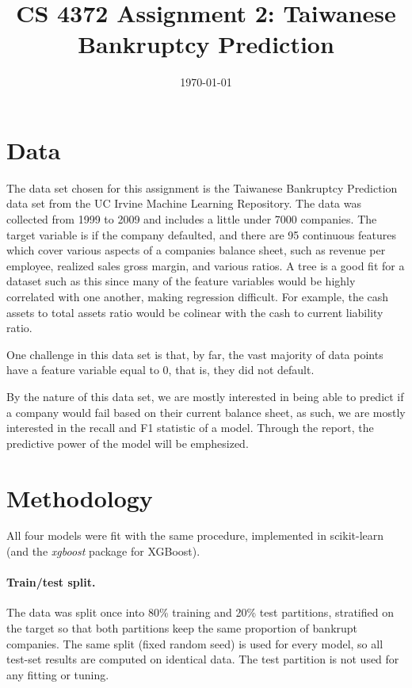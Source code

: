 \documentclass[11pt]{article}
\title{CS 4372 Assignment 2: Taiwanese Bankruptcy Prediction}
\author{}
\date{\today}
\begin{document}
\maketitle

\section{Data}

The data set chosen for this assignment is the Taiwanese Bankruptcy
Prediction data set from the UC Irvine Machine Learning Repository.
The data was collected from 1999 to 2009 and includes a little under
7000 companies. The target variable is if the company defaulted, and
there are 95 continuous features which cover various aspects of a
companies balance sheet, such as revenue per employee, realized sales
gross margin, and various ratios. A tree is a good fit for a dataset
such as this since many of the feature variables would be highly
correlated with one another, making regression difficult. For
example, the cash assets to total assets ratio would be colinear with
the cash to current liability ratio.

One challenge in this data set is that, by far, the vast majority of
data points have a feature variable equal to 0, that is, they did not default.

By the nature of this data set, we are mostly interested in being
able to predict if a company would fail based on their current
balance sheet, as such, we are mostly interested in the recall and F1
statistic of a model. Through the report, the predictive power of the
model will be emphesized.

\section{Methodology}

All four models were fit with the same procedure, implemented in
scikit-learn (and the \textit{xgboost} package for XGBoost).

\paragraph{Train/test split.} The data was split once into 80\%
training and 20\% test partitions, stratified on the target so that
both partitions keep the same proportion of bankrupt companies. The
same split (fixed random seed) is used for every model, so all test-set
results are computed on identical data. The test partition is not used
for any fitting or tuning.
\end{document}
